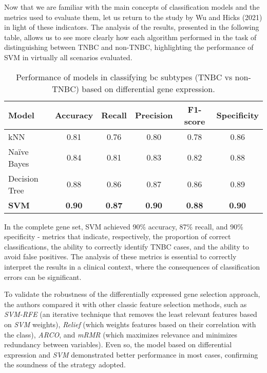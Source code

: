 Now that we are familiar with the main concepts of classification models and
the metrics used to evaluate them, let us return to the study by Wu and Hicks
(2021) in light of these indicators. The analysis of the results, presented in
the following table, allows us to see more clearly how each algorithm performed
in the task of distinguishing between TNBC and non-TNBC, highlighting the
performance of SVM in virtually all scenarios evaluated.

\begin{table}[h!]
  \centering
  \begin{tabular}{|l|c|c|c|c|c|}
    \hline
    \textbf{Model} & \textbf{Accuracy} & \textbf{Recall} & \textbf{Precision} & \textbf{F1-score} & \textbf{Specificity} \\
    \hline
    kNN            & 0.81              & 0.76            & 0.80               & 0.78              & 0.86                 \\
    Naïve Bayes    & 0.84              & 0.81            & 0.83               & 0.82              & 0.88                 \\
    Decision Tree  & 0.88              & 0.86            & 0.87               & 0.86              & 0.89                 \\
    \textbf{SVM}   & \textbf{0.90}     & \textbf{0.87}   & \textbf{0.90}      & \textbf{0.88}     & \textbf{0.90}        \\
    \hline
  \end{tabular}
  \caption{Performance of models in classifying \gls{bc} subtypes (TNBC vs non-TNBC) based on differential gene expression.}
  \label{tab:model-performance}
\end{table}

In the complete gene set, SVM achieved 90\% accuracy, 87\% recall, and 90\%
specificity - metrics that indicate, respectively, the proportion of correct
classifications, the ability to correctly identify TNBC cases, and the ability
to avoid false positives. The analysis of these metrics is essential to
correctly interpret the results in a clinical context, where the consequences
of classification errors can be significant.

To validate the robustness of the differentially expressed gene selection
approach, the authors compared it with other classic feature selection methods,
such as \textit{SVM-RFE} (an iterative technique that removes the least
relevant features based on \textit{SVM} weights), \textit{Relief} (which
weights features based on their correlation with the class), \textit{ARCO}, and
\textit{mRMR} (which maximizes relevance and minimizes redundancy between
variables). Even so, the model based on differential expression and
\textit{SVM} demonstrated better performance in most cases, confirming the
soundness of the strategy adopted.

